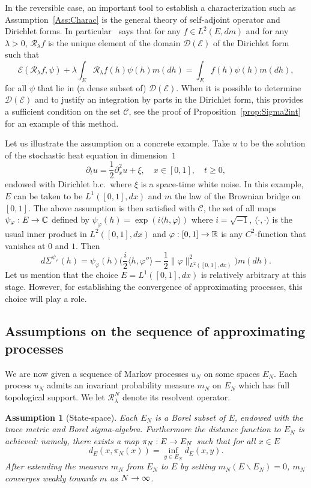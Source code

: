 \documentclass[10pt]{amsart}
\theoremstyle{definition}\newtheorem{defi}[theo]{Definition}\newtheorem{rema}[theo]{Remark}\newtheorem{exam}[theo]{Example}\newtheorem{exem}[theo]{Example}\newtheorem{nota}[theo]{Notation}
\theoremstyle{plain}
\newtheorem{assu}[theo]{Assumption}}
\newcommand{\cC}{\mathcal{C}}
\newcommand{\cD}{\mathcal{D}}
\newcommand{\cE}{\mathcal{E}}
\newcommand{\cR}{\mathcal{R}}
\newcommand{\R}{\mathbb{R}}
\newcommand{\C}{\mathbb{C}}
\renewcommand*{\to}{\mathchoice{\longrightarrow}{\rightarrow}{\rightarrow}{\rightarrow}}
\begin{document}
In the reversible case, an important tool to establish a characterization such as Assumption~\ref{Ass:Charac} is the general theory of self-adjoint operator and Dirichlet forms. In particular~\cite[Theorem~I.2.8]{MaRockner} says that for any $f\in L^2(E,dm)$ and for any $\lambda > 0$, $\cR_\lambda f$ is the unique element of the domain $\cD(\cE)$ of the Dirichlet form such that
\[\label{Eq:CharactDirichlet}
\cE(\cR_\lambda f, \psi) + \lambda \int_E \cR_\lambda f(h) \psi(h) m(dh) = \int_E f(h)\psi(h) m(dh),
\]
for all $\psi$ that lie in (a dense subset of) $\cD(\cE)$. When it is possible to determine $\cD(\cE)$ and to justify an integration by parts in the Dirichlet form, this provides a sufficient condition on the set $\cC$, see the proof of Proposition~\ref{prop:Sigma2int} for an example of this method.



Let us illustrate the assumption on a concrete example. Take $u$ to be the solution of the stochastic heat equation in dimension~$1$
\[
\partial_t u = \frac12 \partial^2_x u + \xi,\quad x\in [0,1],\quad t\ge 0,
\]
endowed with Dirichlet b.c.~where $\xi$ is a space-time white noise. In this example, $E$ can be taken to be $L^1([0,1],dx)$ and $m$ the law of the Brownian bridge on $[0,1]$. The above assumption is then satisfied with $\cC$, the set of all maps $\psi_{\varphi}:E\to\C$ defined by $\psi_\varphi(h) = \exp(i \langle h,\varphi\rangle)$ where $i = \sqrt{-1}$, $\langle \cdot,\cdot\rangle$ is the usual inner product in $L^2([0,1],dx)$ and $\varphi:[0,1]\to\R$ is any $C^2$-function that vanishes at $0$ and $1$. Then
\[
d\Sigma^{\psi_\varphi}(h) = \psi_\varphi(h)\Big(\frac{i}{2} \langle h,\varphi''\rangle - \frac12 \|\varphi\|_{L^2([0,1],dx)}^2 \Big) m(dh).
\]
Let us mention that the choice $E=L^1([0,1],dx)$ is relatively arbitrary at this stage. However, for establishing the convergence of approximating processes, this choice will play a role.


\subsection*{Assumptions on the sequence of approximating processes}

We are now given a sequence of Markov processes $u_N$ on some spaces $E_N$. Each process $u_N$ admits an invariant probability measure $m_N$ on $E_N$ which has full topological support. We let $\cR^N_\lambda$ denote its resolvent operator.

\begin{assu}[State-space]\label{Ass:State}
Each $E_N$ is a Borel subset of $E$, endowed with the trace metric and Borel sigma-algebra. Furthermore the distance function to $E_N$ is achieved: namely, there exists a map $\pi_N:E\to E_N$ such that for all $x\in E$
\[
d_E(x, \pi_N(x)) = \inf_{y\in E_N} d_E(x, y).
\]
After extending the measure $m_N$ from $E_N$ to $E$ by setting $m_N(E\backslash E_N)=0$, $m_N$ converges weakly towards $m$ as $N\to\infty$.
\end{assu}
\end{document}
